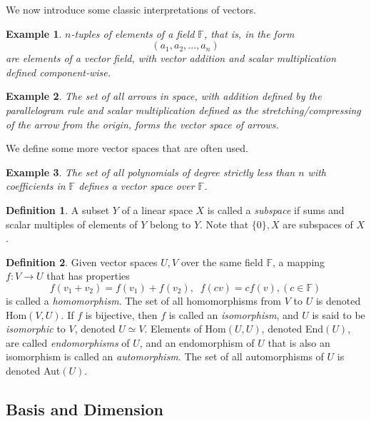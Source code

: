 \documentclass{article}
\newtheorem{example}{Example}[section]
\theoremstyle{remark}
\theoremstyle{definition}
\newtheorem{definition}{Definition}[section]
\begin{document}
  We now introduce some classic interpretations of vectors. 

  \begin{example}
  $n$-tuples of elements of a field $\mathbb{F}$, that is, in the form
  \[(a_1, a_2, ..., a_n)\]
  are elements of a vector field, with vector addition and scalar multiplication defined component-wise. 
  \end{example}

  \begin{example}
  The set of all arrows in space, with addition defined by the parallelogram rule and scalar multiplication defined as the stretching/compressing of the arrow from the origin, forms the vector space of arrows. 
  \end{example}

  We define some more vector spaces that are often used. 

  \begin{example}
  The set of all polynomials of degree strictly less than $n$ with coefficients in $\mathbb{F}$ defines a vector space over $\mathbb{F}$. 
  \end{example}

  \begin{definition}
  A subset $Y$ of a linear space $X$ is called a \textit{subspace} if sums and scalar multiples of elements of $Y$ belong to $Y$. Note that $\{ 0 \}, X$ are subspaces of $X$. 
  \end{definition}

  \begin{definition}
  Given vector spaces $U, V$ over the same field $\mathbb{F}$, a mapping $f: V \longrightarrow U$ that has properties 
  \[ f(v_1 + v_2) = f(v_1) + f(v_2), \; \; f(c v) = c f(v), (c \in \mathbb{F})\]
  is called a \textit{homomorphism}. The set of all homomorphisms from $V$ to $U$ is denoted Hom$(V, U)$. If $f$ is bijective, then $f$ is called an \textit{isomorphism}, and $U$ is said to be \textit{isomorphic} to $V$, denoted $U \simeq V$. Elements of Hom$(U,U)$, denoted End$(U)$, are called \textit{endomorphisms} of $U$, and an endomorphism of $U$ that is also an isomorphism is called an \textit{automorphism}. The set of all automorphisms of $U$ is denoted Aut$(U)$. 
  \end{definition}

  \subsection{Basis and Dimension}
\end{document}
